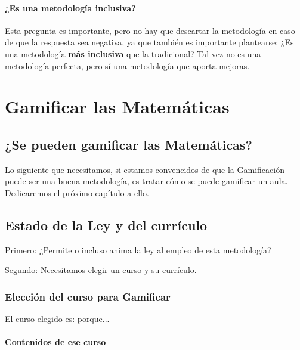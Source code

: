 \documentclass[a4paper, 12pt]{book}
\begin{document}
\subsubsection{¿Es una metodología inclusiva?}

Esta pregunta es importante, pero no hay que descartar la metodología en caso de que la respuesta sea negativa, ya que también es importante plantearse:  ¿Es una metodología \textbf{más inclusiva} que la tradicional?
%
Tal vez no es una metodología perfecta, pero sí una metodología que aporta mejoras.




\cleardoublepage
\chapter{Gamificar las Matemáticas}

\section{¿Se pueden gamificar las Matemáticas?}

Lo siguiente que necesitamos, si estamos convencidos de que la Gamificación puede ser una buena metodología, es tratar cómo se puede gamificar un aula.
%
Dedicaremos el próximo capítulo a ello.

\section{Estado de la Ley y del currículo}

Primero: ¿Permite o incluso anima la ley al empleo de esta metodología?

Segundo: Necesitamos elegir un curso y su currículo.

\subsection{Elección del curso para Gamificar}

El curso elegido es: porque...

\subsubsection{Contenidos de ese curso}
\end{document}
